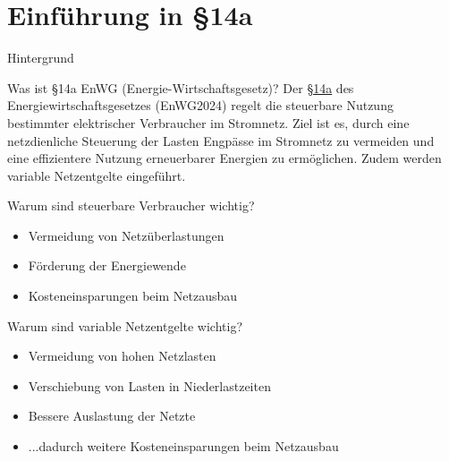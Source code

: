 
\section{Einführung in §14a}

\begin{frame}[allowframebreaks]{Hintergrund}
    \begin{block}{Was ist §14a EnWG (Energie-Wirtschaftsgesetz)?}
        Der \href{https://www.gesetze-im-internet.de/enwg_2005/__14a.html}{§14a} des Energiewirtschaftsgesetzes (EnWG2024\cite{EnWG2024}) regelt die steuerbare Nutzung bestimmter elektrischer Verbraucher im Stromnetz. Ziel ist es, durch eine netzdienliche Steuerung der Lasten Engpässe im Stromnetz zu vermeiden und eine effizientere Nutzung erneuerbarer Energien zu ermöglichen.
        Zudem werden variable Netzentgelte eingeführt.
    \end{block}

    \framebreak

    \begin{block}{Warum sind steuerbare Verbraucher wichtig?}
        \begin{itemize}
            \item Vermeidung von Netzüberlastungen
            \item Förderung der Energiewende
            \item Kosteneinsparungen beim Netzausbau
        \end{itemize}
    \end{block}

    \begin{block}{Warum sind variable Netzentgelte wichtig?}
        \begin{itemize}
            \item Vermeidung von hohen Netzlasten
            \item Verschiebung von Lasten in Niederlastzeiten
            \item Bessere Auslastung der Netzte
            \item ...dadurch weitere Kosteneinsparungen beim Netzausbau
        \end{itemize}
    \end{block}

    \framebreak


\end{frame}
